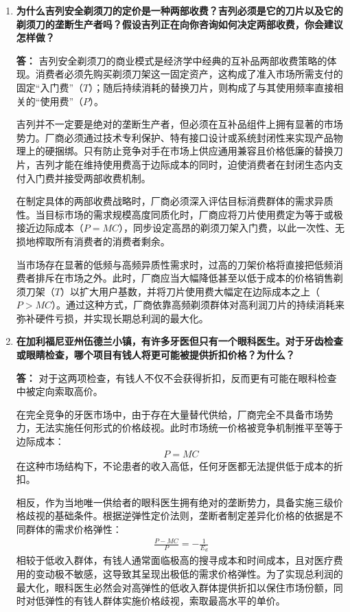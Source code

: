 \begin{enumerate}[label=\textbf{\arabic*.}, leftmargin=*]
		\item \textbf{为什么吉列安全剃须刀的定价是一种两部收费？吉列必须是它的刀片以及它的剃须刀的垄断生产者吗？假设吉列正在向你咨询如何决定两部收费，你会建议怎样做？}
		
		\textbf{答：}
		吉列安全剃须刀的商业模式是经济学中经典的互补品两部收费策略的体现。消费者必须先购买剃须刀架这一固定资产，这构成了准入市场所需支付的固定“入门费”（$T$）；随后持续消耗的替换刀片，则构成了与其使用频率直接相关的“使用费”（$P$）。
		
		吉列并不一定要是绝对的垄断生产者，但必须在互补品组件上拥有显著的市场势力。厂商必须通过技术专利保护、特有接口设计或系统封闭性来实现产品物理上的硬捆绑。只有防止竞争对手在市场上供应通用兼容且价格低廉的替换刀片，吉列才能在维持使用费高于边际成本的同时，迫使消费者在封闭生态内支付入门费并接受两部收费机制。
		
		在制定具体的两部收费战略时，厂商必须深入评估目标消费群体的需求异质性。当目标市场的需求规模高度同质化时，厂商应将刀片使用费定为等于或极接近边际成本（$P=MC$），同步设定高昂的剃须刀架入门费，以此一次性、无损地榨取所有消费者的消费者剩余。
		
		当市场存在显著的低频与高频异质性需求时，过高的刀架价格将直接把低频消费者排斥在市场之外。此时，厂商应当大幅降低甚至以低于成本的价格销售剃须刀架（$T$）以扩大用户基数，并将刀片使用费大幅定在边际成本之上（$P>MC$）。通过这种方式，厂商依靠高频剃须群体对高利润刀片的持续消耗来弥补硬件亏损，并实现长期总利润的最大化。
		
		\item \textbf{在加利福尼亚州伍德兰小镇，有许多牙医但只有一个眼科医生。对于牙齿检查或眼睛检查，哪个项目有钱人将更可能被提供折扣价格？为什么？}
		
		\textbf{答：}
		对于这两项检查，有钱人不仅不会获得折扣，反而更有可能在眼科检查中被定向索取高价。
		
		在完全竞争的牙医市场中，由于存在大量替代供给，厂商完全不具备市场势力，无法实施任何形式的价格歧视。此时市场统一价格被竞争机制推平至等于边际成本：
		\[
		\begin{aligned}
			P = MC
		\end{aligned}
		\]
		在这种市场结构下，不论患者的收入高低，任何牙医都无法提供低于成本的折扣。
		
		相反，作为当地唯一供给者的眼科医生拥有绝对的垄断势力，具备实施三级价格歧视的基础条件。根据逆弹性定价法则，垄断者制定差异化价格的依据是不同群体的需求价格弹性：
		\[
		\begin{aligned}
			\frac{P - MC}{P} = -\frac{1}{E_d}
		\end{aligned}
		\]
		相较于低收入群体，有钱人通常面临极高的搜寻成本和时间成本，且对医疗费用的变动极不敏感，这导致其呈现出极低的需求价格弹性。为了实现总利润的最大化，眼科医生必然会对高弹性的低收入群体提供折扣以保住市场份额，同时对低弹性的有钱人群体实施价格歧视，索取最高水平的单价。
		

\end{enumerate}
